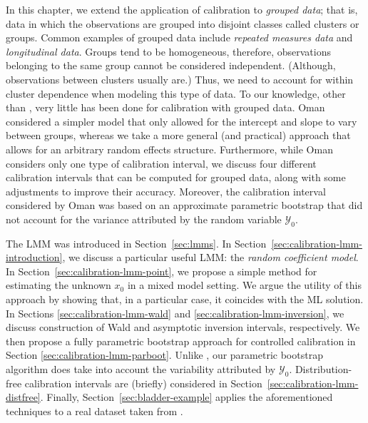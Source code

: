 \documentclass[cmfont,usenames,dvipsnames,leqno]{afit-etd}\usepackage[]{graphicx}\usepackage[]{color}
\newcommand{\mc}[1]{\ensuremath{\mathcal{#1}}}
\begin{document}
In this chapter, we extend the application of calibration to \textit{grouped data}; that is, data in which the observations are grouped into disjoint classes called clusters or groups. Common examples of grouped data include \textit{repeated measures data} and \textit{longitudinal data}. Groups tend to be homogeneous, therefore, observations belonging to the same group cannot be considered independent. (Although, observations between clusters usually are.) Thus, we need to account for within cluster dependence when modeling this type of data. To our knowledge, other than \citet{oman_calibration_1998}, very little has been done for calibration with grouped data. Oman considered a simpler model that only allowed for the intercept and slope to vary between groups, whereas we take a more general (and practical) approach that allows for an arbitrary random effects structure. Furthermore, while Oman considers only one type of calibration interval, we discuss four different calibration intervals that can be computed for grouped data, along with some adjustments to improve their accuracy. Moreover, the calibration interval considered by Oman was based on an approximate parametric bootstrap that did not account for the variance attributed by the random variable $\mc{Y}_0$.

The \ac{LMM} was introduced in Section~\ref{sec:lmms}. In Section~\ref{sec:calibration-lmm-introduction}, we discuss a particular useful LMM: the \textit{random coefficient model}. In Section~\ref{sec:calibration-lmm-point}, we propose a simple method for estimating the unknown $x_0$ in a mixed model setting. We argue the utility of this approach by showing that, in a particular case, it coincides with the \ac{ML} solution. In Sections \ref{sec:calibration-lmm-wald} and \ref{sec:calibration-lmm-inversion}, we discuss construction of Wald and asymptotic inversion intervals, respectively. We then propose a fully parametric bootstrap approach for controlled calibration in Section \ref{sec:calibration-lmm-parboot}. Unlike \citet{oman_calibration_1998}, our parametric bootstrap algorithm does take into account the variability attributed by $\mc{Y}_0$. Distribution-free calibration intervals are (briefly) considered in Section~\ref{sec:calibration-lmm-distfree}. Finally, Section~\ref{sec:bladder-example} applies the aforementioned techniques to a real dataset taken from \citet{brown_measurement_1993}.
\end{document}
